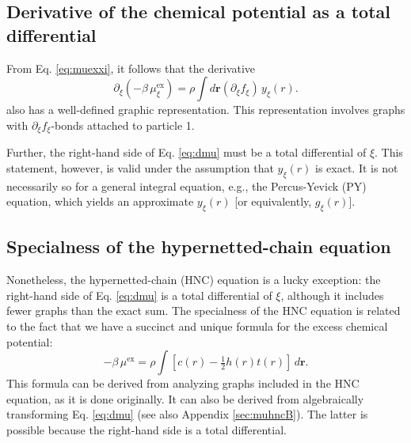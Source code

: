 \documentclass[notitlepage, preprint]{revtex4-1}
\newcommand{\vct}[1]{\mathbf{#1}}
\providecommand{\vr}{} %
\renewcommand{\vr}{\vct{r}}
\newcommand{\supex}[1]{ { { #1 }^{ \mathrm{ex} } } }
\newcommand{\muex}{\supex{\mu}}
\newcommand{\muexxi}{\mu^{ \mathrm{ex} }_\xi}
\begin{document}
\subsection{Derivative of the chemical potential as a total differential}



From Eq. \eqref{eq:muexxi}, it follows that the derivative
\begin{equation}
  \partial_\xi (-\beta \, \muexxi)
  = \rho \int d\vr (\partial_\xi f_\xi) \, y_\xi(r).
\label{eq:dmu}
\end{equation}
also has a well-defined graphic representation.
%
This representation involves graphs with $\partial_\xi f_\xi$-bonds
attached to particle 1.

Further, the right-hand side of Eq. \eqref{eq:dmu}
must be a total differential of $\xi$.
%
This statement, however, is valid under the assumption that
$y_\xi(r)$ is exact.
%
It is not necessarily so for a general integral equation,
e.g., the Percus-Yevick (PY) equation\cite{percusyevick},
which yields an approximate $y_\xi(r)$ [or equivalently, $g_\xi(r)$].





\subsection{Specialness of the hypernetted-chain equation}



Nonetheless,
  the hypernetted-chain (HNC) equation\cite{
  morita1958, morita1959, morita1960, vanleeuwen1959, green1960, verlet1960, rushbrooke1960}
  is a lucky exception:
the right-hand side of Eq. \eqref{eq:dmu} is a total differential of $\xi$,
  although it includes fewer graphs than the exact sum.
%
The specialness of the HNC equation is related to the fact that
%
we have a succinct and unique formula\cite{morita1960, singer1985}
for the excess chemical potential:
\begin{equation}
  -\beta \, \muex
=
  \rho \int
  \left[ c(r) - \tfrac{1}{2} h(r) t(r) \right] \, d\vr.
\label{eq:muhnc}
\end{equation}
%
This formula can be derived from analyzing graphs included in the HNC equation,
as it is done originally\cite{morita1960}.
%
It can also be derived from algebraically transforming Eq. \eqref{eq:dmu}\cite{singer1985}
(see also Appendix \ref{sec:muhncB}).
%
The latter is possible because the right-hand side is a total differential.
\end{document}
